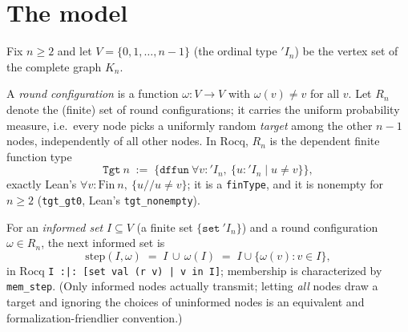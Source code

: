 \section{The model}\label{rs:sec:model}

Fix $n \ge 2$ and let $V = \{0,1,\dots,n-1\}$ (the ordinal type $'I_n$) be
the vertex set of the complete graph $K_n$.

\begin{definition}\label{rs:round}
  \rocqok
  A \emph{round configuration} is a function
  $\omega \colon V \to V$ with $\omega(v) \ne v$ for all $v$.
  Let $R_n$ denote the (finite) set of round configurations; it carries the
  uniform probability measure, i.e.\ every node picks a uniformly random
  \emph{target} among the other $n-1$ nodes, independently of all other
  nodes. In Rocq, $R_n$ is the dependent finite function type
  \[
    \texttt{Tgt}\ n \;:=\;
    \{\texttt{dffun}\ \forall v : 'I_n,\ \{u : 'I_n \mid u \ne v\}\},
  \]
  exactly Lean's $\forall v : \mathrm{Fin}\ n,\ \{u \mathbin{/\!/} u \ne v\}$;
  it is a \texttt{finType}, and it is nonempty for $n \ge 2$
  (\texttt{tgt\_gt0}, Lean's \texttt{tgt\_nonempty}).
\end{definition}

\begin{definition}\label{rs:step}
  \rocqok
  For an \emph{informed set} $I \subseteq V$ (a finite set
  $\{\texttt{set}\ 'I_n\}$) and a round configuration
  $\omega \in R_n$, the next informed set is
  \[
    \mathrm{step}(I,\omega) \;=\; I \,\cup\, \omega(I)
    \;=\; I \cup \{\omega(v) : v \in I\},
  \]
  in Rocq \texttt{I :|: [set val (r v) | v in I]}; membership is
  characterized by \texttt{mem\_step}.
  (Only informed nodes actually transmit; letting \emph{all} nodes draw a
  target and ignoring the choices of uninformed nodes is an equivalent and
  formalization-friendlier convention.)
\end{definition}

